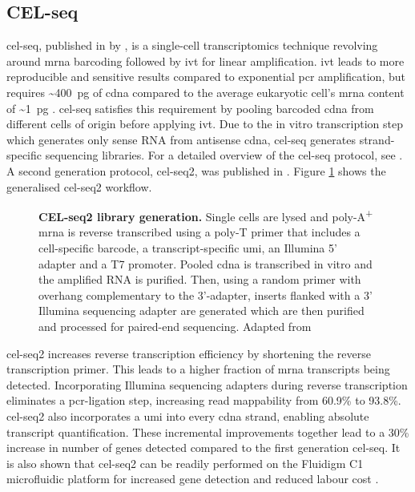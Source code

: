 \subsection{CEL-seq}
\label{subsect:lit_cel-seq}
\Acrfull{cel-seq}, published in \citeyear{hashimshony2012} by \citeauthor{hashimshony2012}, is a single-cell transcriptomics technique revolving around \acrshort{mrna} barcoding followed by \acrfull{ivt} for linear amplification. \Acrshort{ivt} leads to more reproducible and sensitive results compared to exponential \acrshort{pcr} amplification, but requires \textasciitilde\SI{400}{\pico\gram} of \acrshort{cdna} compared to the average eukaryotic cell's \acrshort{mrna} content of \textasciitilde\SI{1}{\pico\gram} \citep{tang2011, hashimshony2012}. \acrshort{cel-seq} satisfies this requirement by pooling barcoded \acrshort{cdna} from different cells of origin before applying \acrshort{ivt}. Due to the in vitro transcription step which generates only sense RNA from antisense \acrshort{cdna}, \acrshort{cel-seq} generates strand-specific sequencing libraries. For a detailed overview of the \acrshort{cel-seq} protocol, see \citep{hashimshony2012}. A second generation protocol, \acrshort{cel-seq}2, was published in \citeyear{hashimshony2016}. Figure \ref{fig:hashimshony2016_fig1_edited} shows the generalised \acrshort{cel-seq}2 workflow.\pms

\begin{figure}
	\centerfloat
	\def\svgwidth{\textwidth}
	
	\caption[CEL-seq2 library generation]{\textbf{CEL-seq2 library generation.} Single cells are lysed and poly-A\textsuperscript{+} \acrshort{mrna} is reverse transcribed using a poly-T primer that includes a cell-specific barcode, a transcript-specific \acrshort{umi}, an Illumina 5' adapter and a T7 promoter. Pooled \acrshort{cdna} is transcribed in vitro and the amplified RNA is purified. Then, using a random primer with overhang complementary to the 3'-adapter, inserts flanked with a 3' Illumina sequencing adapter are generated which are then purified and processed for paired-end sequencing. Adapted from \cite{hashimshony2016}}
	\label{fig:hashimshony2016_fig1_edited}
\end{figure}

\acrshort{cel-seq}2 increases reverse transcription efficiency by shortening the reverse transcription primer. This leads to a higher fraction of \acrshort{mrna} transcripts being detected. Incorporating Illumina sequencing adapters during reverse transcription eliminates a \acrshort{pcr}-ligation step, increasing read mappability from 60.9\% to 93.8\%. \acrshort{cel-seq}2 also incorporates a \acrshort{umi} into every \acrshort{cdna} strand, enabling absolute transcript quantification. These incremental improvements together lead to a 30\% increase in number of genes detected compared to the first generation \acrshort{cel-seq}. It is also shown that \acrshort{cel-seq}2 can be readily performed on the Fluidigm C1 microfluidic platform for increased gene detection and reduced labour cost \citep{hashimshony2016}.\pms

